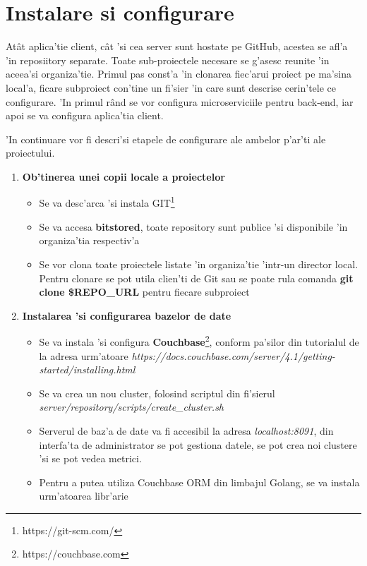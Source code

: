 \documentclass[12pt,a4paper,twoside]{report}
\begin{document}
\section{Instalare si configurare}
Atât aplica'tie client, cât 'si cea server sunt hostate pe GitHub, acestea se afl'a 'in reposiitory separate. Toate sub-proiectele necesare se g'asesc reunite 'in aceea'si organiza'tie. Primul pas const'a 'in clonarea fiec'arui proiect pe ma'sina local'a, ficare subproiect con'tine un fi'sier 'in care sunt descrise cerin'tele ce configurare. 'In primul rând se vor configura microserviciile pentru back-end, iar apoi se va configura aplica'tia client. 

'In continuare vor fi descri'si etapele de configurare ale ambelor p'ar'ti ale proiectului.
\begin{enumerate}[label=Pasul \arabic*]
\item{\textbf{Ob'tinerea unei copii locale a proiectelor}
\begin{itemize}
\item{Se va desc'arca 'si instala GIT\footnote{https://git-scm.com/}}
\item{Se va accesa \textbf{bitstored}, toate repository sunt publice 'si disponibile 'in organiza'tia respectiv'a}
\item{Se vor clona toate proiectele listate 'in organiza'tie 'intr-un director local. Pentru clonare se pot utila clien'ti de Git sau se poate rula comanda \textbf{git clone \$REPO\_URL} pentru fiecare subproiect}
\end{itemize}
}
\item{\textbf{Instalarea 'si configurarea bazelor de date}\label{instal_db}
\begin{itemize}
\item{ Se va instala 'si configura \textbf{Couchbase}\footnote{https://couchbase.com}, conform pa'silor din tutorialul de la adresa urm'atoare \textit{https://docs.couchbase.com/server/4.1/getting-started/installing.html}}
\item{ Se va crea un nou cluster, folosind scriptul din fi'sierul \\ \textit{server/repository/scripts/create\_cluster.sh}}
\item{ Serverul de baz'a de date va fi accesibil la adresa \textit{localhost:8091}, din interfa'ta de administrator se pot gestiona datele, se pot crea noi clustere 'si se pot vedea metrici.}
\item {Pentru a putea utiliza Couchbase ORM din limbajul Golang, se va instala urm'atoarea libr'arie
}
\end{itemize}}
\end{enumerate}
\end{document}
